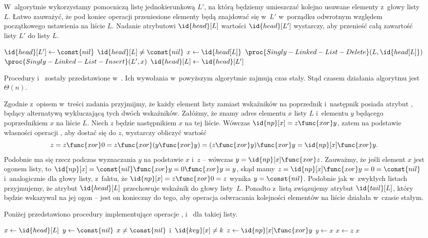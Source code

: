 \exercise %
W~algorytmie wykorzystamy pomocniczą listę jednokierunkową $L'$, na którą będziemy umieszczać kolejno usuwane elementy z~głowy listy $L$. Łatwo zauważyć, że pod koniec operacji przeniesione elementy będą znajdować się w~$L'$ w~porządku odwrotnym względem początkowego ustawienia na liście $L$. Nadanie atrybutowi $\id{head}[L]$ wartości $\id{head}[L']$ wystarczy, aby przenieść całą zawartość listy $L'$ do listy $L$.
\begin{codebox}
\li	$\id{head}[L']\gets\const{nil}$
\li	\While $\id{head}[L]\ne\const{nil}$
\li		\Do
			$x\gets\id{head[L]}$
\li			$\proc{Singly-Linked-List-Delete}(L,\id{head[L]})$
\li			$\proc{Singly-Linked-List-Insert}(L',x)$
		\End
\li	$\id{head}[L]\gets\id{head}[L']$
\end{codebox}

Procedury  i~ zostały przedstawione w~. Ich wywołania w~powyższym algorytmie zajmują czas stały. Stąd czasem działania algorytmu jest $\Theta(n)$.

\exercise %
Zgodnie z~opisem w~treści zadania przyjmijmy, że każdy element listy zamiast wskaźników na poprzednik i~następnik posiada atrybut , będący alternatywą wykluczającą tych dwóch wskaźników. Załóżmy, że znamy adres elementu $x$ listy $L$ i~elementu $y$ będącego poprzednikiem $x$ na liście $L$. Niech $z$ będzie następnikiem $x$ na tej liście. Wówczas $\id{np}[x]=z\func{xor}y$, zatem na podstawie własności operacji , aby dostać się do $z$, wystarczy obliczyć wartość
\[
    z = z\func{xor}0 = z\func{xor}(y\func{xor}y) = (z\func{xor}y)\func{xor}y = \id{np}[x]\func{xor}y.
\]
Podobnie ma się rzecz podczas wyznaczania $y$ na podstawie $x$ i~$z$ -- wówczas $y=\id{np}[x]\func{xor}z$. Zauważmy, że jeśli element $x$ jest ogonem listy, to $\id{np}[x]=\const{nil}\func{xor}y=0\func{xor}y=y$, skąd mamy $z=\id{np}[x]\func{xor}y=0=\const{nil}$ i~analogicznie dla głowy listy, z~faktu, że $\id{np}[x]=z\func{xor}0=z$ wynika $y=\const{nil}$. Podobnie jak w~zwykłych listach przyjmujemy, że atrybut $\id{head}[L]$ przechowuje wskaźnik do głowy listy~$L$. Ponadto z~listą związujemy atrybut $\id{tail}[L]$, który będzie wskazywał na jej ogon -- jest on konieczny do tego, aby operacja odwracania kolejności elementów na liście działała w~czasie stałym.

Poniżej przedstawiono procedury implementujące operacje ,  i~ dla takiej listy.
\begin{codebox}
\li	$x\gets\id{head}[L]$
\li	$y\gets\const{nil}$
\li	\While $x\ne\const{nil}$ i~$\id{key}[x]\ne k$
\li		\Do
			$z\gets\id{np}[x]\func{xor}y$
\li			$y\gets x$
\li			$x\gets z$
		\End
\li	\Return $x$
\end{codebox}

